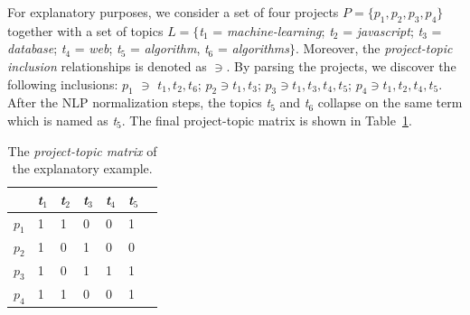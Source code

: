 For explanatory purposes, we consider a set of four projects $P=\{p_1,p_2,p_3,p_4 \}$ together with a set of topics $L=\{$\emph{t$_1$} = \emph{machine-learning}; \emph{t$_2$} = \emph{javascript}; \emph{t$_3$} = \emph{database}; \emph{t$_4$} = \emph{web}; \emph{t$_5$} = \emph{algorithm}, \emph{t$_6$} = \emph{algorithms}$\}$. Moreover, the \emph{project-topic inclusion} relationships is denoted as $\ni$. By parsing the projects, we discover the following inclusions: $p_1$ $\ni$ $t_1,t_2, t_6$; $p_2 \ni t_1,t_3$; $p_3 \ni t_1 ,t_3, t_4, t_5$; $p_4 \ni t_1,t_2,t_4,t_5$. After the NLP normalization steps, the topics \emph{t$_5$} and \emph{t$_6$} collapse on the same term which is named as \emph{t$_{5}$}. The final project-topic matrix is shown in Table~\ref{tab:repo-topic-matrix}. %

\begin{table}[h!]
	\caption{The \emph{project-topic matrix} of the explanatory example.}
	\begin{tabular}{|p{0.5cm}|p{0.5cm}|p{0.5cm}|p{0.5cm}|p{0.5cm}|p{0.5cm}|p{0.5cm}|} \hline
		& \emph{t$_1$} & \emph{t$_2$} & \emph{t$_3$} & \emph{t$_4$} & \emph{t$_{5}$} \\ \hline
		$p_1$ & 1 & 1 & 0 & 0 & 1 \\ \hline
		$p_2$ & 1 & 0 & 1 & 0 & 0 \\ \hline
		$p_3$ & 1 & 0 & 1 & 1 & 1 \\ \hline
		$p_4$ & 1 & 1 & 0 & 0 & 1 \\ \hline
	\end{tabular}
    \label{tab:repo-topic-matrix}
\end{table}






